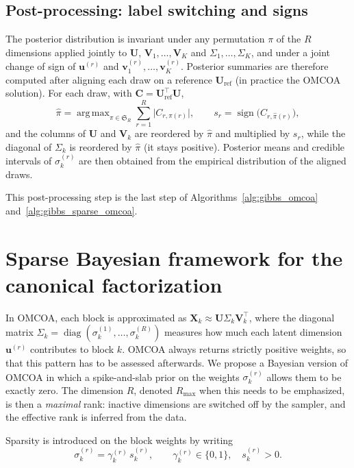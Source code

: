 \documentclass[11pt]{article}
\DeclareMathOperator{\diag}{diag}
\DeclareMathOperator*{\argmax}{arg\,max}
\newcommand{\X}{\mathbf{X}}
\newcommand{\U}{\mathbf{U}}
\newcommand{\V}{\mathbf{V}}
\newcommand{\uu}{\mathbf{u}}
\newcommand{\vv}{\mathbf{v}}
\begin{document}
\subsection{Post-processing: label switching and signs}\label{sec:align}

The posterior distribution is invariant under any permutation $\pi$ of the $R$ dimensions applied jointly to
$\U$, $\V_1,\ldots,\V_K$ and $\Sigma_1,\ldots,\Sigma_K$, and under a joint change of sign of $\uu^{(r)}$ and
$\vv_1^{(r)},\ldots,\vv_K^{(r)}$. Posterior summaries are therefore computed after aligning each draw on a reference
$\U_{\mathrm{ref}}$ (in practice the OMCOA solution). For each draw, with $\mathbf C=\U_{\mathrm{ref}}^\intercal\U$,
\[
  \hat\pi=\argmax_{\pi\in\mathfrak S_R}\sum_{r=1}^R\bigl|C_{r,\pi(r)}\bigr|,\qquad
  s_r=\operatorname{sign}\bigl(C_{r,\hat\pi(r)}\bigr),
\]
and the columns of $\U$ and $\V_k$ are reordered by $\hat\pi$ and multiplied by $s_r$, while the diagonal of
$\Sigma_k$ is reordered by $\hat\pi$ (it stays positive). Posterior means and credible intervals of $\sigma_k^{(r)}$
are then obtained from the empirical distribution of the aligned draws.

This post-processing step is the last step of Algorithms~\ref{alg:gibbs_omcoa} and~\ref{alg:gibbs_sparse_omcoa}.



\section{Sparse Bayesian framework for the canonical factorization}
In OMCOA, each block is approximated as $\X_k\approx\U\Sigma_k\V_k^\intercal$, where the diagonal matrix
$\Sigma_k=\diag(\sigma_k^{(1)},\ldots,\sigma_k^{(R)})$ measures how much each latent dimension $\uu^{(r)}$ contributes to block $k$. OMCOA always returns strictly positive weights, so that this pattern has to be assessed afterwards. We propose a Bayesian version of OMCOA in which a spike-and-slab prior on the weights $\sigma_k^{(r)}$ allows them to be exactly zero. The dimension $R$, denoted $R_{\max}$ when this needs to be emphasized, is then a \emph{maximal} rank: inactive dimensions are switched off by the sampler, and the effective rank is inferred from the data.

Sparsity is introduced on the block weights by writing
\begin{equation}
  \sigma_k^{(r)}=\gamma_k^{(r)}\,s_k^{(r)},\qquad \gamma_k^{(r)}\in\{0,1\},\quad s_k^{(r)}>0 .
  \label{eq:spike}
\end{equation}
\end{document}
